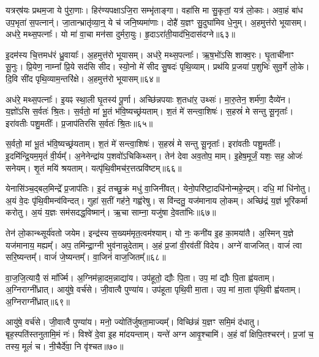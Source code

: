 यत्रर्‌\mbox{}ष॑यः प्रथम॒जा ये पु॑रा॒णाः।
हिर॑ण्यपक्षा\-ऽजि॒रा सम्भृ॑ताङ्गा।
वहा॑सि मा सु॒कृतां॒ यत्र॑ लो॒काः।
अवा॒हं बा॑ध उप॒भृता॑ स॒पत्नान्॑।
जा॒तान्भ्रातृ॑व्या॒न्॒ ये च॑ जनि॒ष्यमा॑णाः।
दोहै॑ य॒ज्ञꣳ सु॒दुघा॑मिव धे॒नुम्।
अ॒हमुत्त॑रो भूयासम्।
अध॑रे॒ मथ्स॒पत्नाः᳚।
यो मा॑ वा॒चा मन॑सा दुर्मरा॒युः।
हृ॒दा\-ऽरा॑ती॒याद॑भि॒दास॑दग्ने॥६३॥\ip

इ॒दम॑स्य चि॒त्तमध॑रं ध्रु॒वायाः᳚।
अ॒हमुत्त॑रो भूयासम्।
अध॑रे॒ मथ्स॒पत्नाः᳚।
ऋ॒ष॒भो॑ऽसि शाक्व॒रः।
घृ॒ताची॑नाꣳ सू॒नुः।
प्रि॒येण॒ नाम्ना᳚ प्रि॒ये सद॑सि सीद।
स्यो॒नो मे॑ सीद सु॒षदः॑ पृथि॒व्याम्।
प्रथ॑यि प्र॒जया॑ प॒शुभिः॑ सुव॒र्गे लो॒के।
दि॒वि सी॑द पृथि॒व्याम॒न्तरि॑क्षे।
अ॒हमुत्त॑रो भूयासम्॥६४॥\ip\phantom{त्त॑}%

अध॑रे॒ मथ्स॒पत्नाः᳚।
इ॒यꣴ स्था॒ली घृ॒तस्य॑ पू॒र्णा।
अच्छि॑न्नपयाः श॒तधा॑र॒ उथ्सः॑।
मा॒रु॒तेन॒ शर्म॑णा॒ दैव्ये॑न।
य॒ज्ञो॑ऽसि स॒र्वतः॑ श्रि॒तः।
स॒र्वतो॒ मां भू॒तं भ॑वि॒ष्यच्छ्र॑यताम्।
श॒तं मे॑ सन्त्वा॒शिषः॑।
स॒हस्रं॑ मे सन्तु सू॒नृताः᳚।
इरा॑वतीः पशु॒मतीः᳚।
प्र॒जा\-प॑तिरसि स॒र्वतः॑ श्रि॒तः॥६५॥\ip

स॒र्वतो॒ मां भू॒तं भ॑वि॒ष्यच्छ्र॑यताम्।
श॒तं मे॑ सन्त्वा॒शिषः॑।
स॒हस्रं॑ मे सन्तु सू॒नृताः᳚।
इरा॑वतीः पशु॒मतीः᳚।
इ॒दमि॑न्द्रि॒यम॒मृतं॑ वी॒र्यम्᳚।
अ॒नेनेन्द्रा॑य प॒शवो॑\-ऽचिकिथ्सन्।
तेन॑ देवा अव॒तोप॒ माम्।
इ॒हेष॒मूर्जं॒ यशः॒ सह॒ ओजः॑ सनेयम्।
शृ॒तं मयि॑ श्रयताम्।
यत्पृ॑थि॒वीमच॑र॒त्तत्प्रवि॑ष्टम्॥६६॥\ip

येनासि॑ञ्च॒द्बल॒मिन्द्रे᳚ प्र॒जा\-प॑तिः।
इ॒दं तच्छु॒क्रं मधु॑ वा॒जिनी॑वत्।
येनो॒परि॑ष्टा॒दधि॑नोन्महे॒\-न्द्रम्।
दधि॒ मां धि॑नोतु।
अ॒यं वे॒दः पृ॑थि॒वीमन्व॑विन्दत्।
गुहा॑ स॒तीं गह॑ने॒ गह्व॑रेषु।
स वि॑न्दतु॒ यज॑मानाय लो॒कम्।
अच्छि॑द्रं य॒ज्ञं भूरि॑कर्मा करोतु।
अ॒यं य॒ज्ञः सम॑सदद्ध॒विष्मान्॑।
ऋ॒चा साम्ना॒ यजु॑षा दे॒वता॑भिः॥६७॥\ip

तेन॑ लो॒कान्थ्सूर्य॑वतो जयेम।
इन्द्र॑स्य स॒ख्यम॑मृत॒त्वम॑\-श्याम्।
यो नः॒ कनी॑य इ॒ह का॒मया॑तै।
अ॒स्मिन् य॒ज्ञे यज॑मानाय॒ मह्यम्᳚।
अप॒ तमि॑न्द्रा॒ग्नी भुव॑नान्नुदेताम्।
अ॒हं प्र॒जां वी॒रव॑तीं विदेय।
अग्ने॑ वाजजित्।
वाजं॑ त्वा सरि॒ष्यन्तम्᳚।
वाजं॑ जे॒ष्यन्तम्᳚।
वा॒जिनं॑ वाज॒जितम्᳚॥६८॥\ip

वा॒ज॒जि॒त्यायै॒ सं मा᳚र्ज्मि।
अ॒ग्निम॑न्ना॒दम॒न्नाद्या॑य।
उप॑हूतो॒ द्यौः पि॒ता।
उप॒ मां द्यौः पि॒ता ह्व॑यताम्।
अ॒ग्निराग्नी᳚ध्रात्।
आयु॑षे॒ वर्च॑से।
जी॒वात्वै पुण्या॑य।
उप॑हूता पृथि॒वी मा॒ता।
उप॒ मां मा॒ता पृ॑थि॒वी ह्व॑यताम्।
अ॒ग्निराग्नी᳚ध्रात्॥६९॥\ip

आयु॑षे॒ वर्च॑से।
जी॒वात्वै पुण्या॑य।
मनो॒ ज्योति॑र्जुषता॒मा\-ज्यम्᳚।
विच्छि॑न्नं य॒ज्ञꣳ समि॒मं द॑धातु।
बृह॒स्पति॑स्तनुतामि॒मं नः॑।
विश्वे॑ दे॒वा इ॒ह मा॑दयन्ताम्।
यन्ते॑ अग्न आवृ॒श्चामि॑।
अ॒हं वा᳚ क्षिपि॒तश्चरन्॑।
प्र॒जां च॒ तस्य॒ मूलं॑ च।
नी॒चैर्दे॑वा॒ नि वृ॑श्चत॥७०॥\ip

